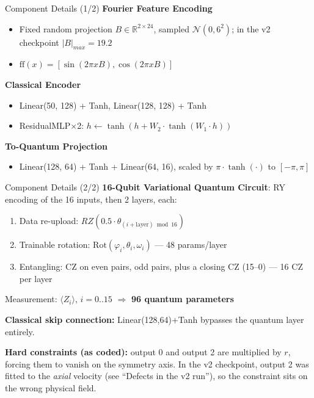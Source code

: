 \documentclass[aspectratio=169]{beamer}
\begin{document}
\begin{frame}{Component Details (1/2)}
\textbf{Fourier Feature Encoding}
\begin{itemize}
  \item Fixed random projection $B \in \mathbb{R}^{2\times24}$, sampled $\mathcal{N}(0, 6^2)$; in the v2 checkpoint $|B|_{max}=19.2$
  \item $\text{ff}(x) = [\sin(2\pi x B), \cos(2\pi x B)]$
\end{itemize}

\vspace{0.2cm}
\textbf{Classical Encoder}
\begin{itemize}
  \item Linear(50, 128) + Tanh, Linear(128, 128) + Tanh
  \item ResidualMLP$\times$2: $h \leftarrow \tanh(h + W_2 \cdot \tanh(W_1 \cdot h))$
\end{itemize}

\vspace{0.2cm}
\textbf{To-Quantum Projection}
\begin{itemize}
  \item Linear(128, 64) + Tanh + Linear(64, 16), scaled by $\pi\cdot\tanh(\cdot)$ to $[-\pi, \pi]$
\end{itemize}
\end{frame}

\begin{frame}{Component Details (2/2)}
\textbf{16-Qubit Variational Quantum Circuit}: RY encoding of the 16 inputs, then 2 layers, each:
\begin{enumerate}
  \item Data re-upload: $RZ(0.5\cdot\theta_{(i+\text{layer}) \bmod 16})$
  \item Trainable rotation: $\text{Rot}(\varphi_i, \theta_i, \omega_i)$ --- 48 params/layer
  \item Entangling: CZ on even pairs, odd pairs, plus a closing CZ (15--0) --- 16 CZ per layer
\end{enumerate}
Measurement: $\langle Z_i \rangle$, $i = 0..15$ \quad $\Rightarrow$ \textbf{96 quantum parameters}

\vspace{0.2cm}
\textbf{Classical skip connection:} Linear(128,64)+Tanh bypasses the quantum layer entirely.

\vspace{0.2cm}
\textbf{Hard constraints (as coded):} output 0 and output 2 are multiplied by $r$, forcing them to vanish on the symmetry axis. In the v2 checkpoint, output 2 was fitted to the \emph{axial} velocity (see ``Defects in the v2 run''), so the constraint sits on the wrong physical field.
\end{frame}
\end{document}
